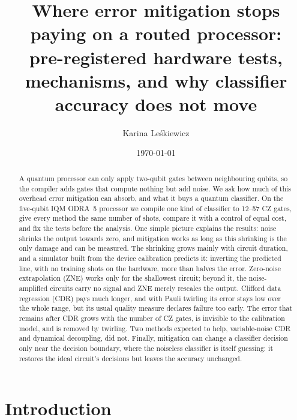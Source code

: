 \documentclass[aps,pra,twocolumn,superscriptaddress,nofootinbib,10pt]{revtex4-2}
\begin{document}
\title{Where error mitigation stops paying on a routed processor:\\
pre-registered hardware tests, mechanisms, and why classifier accuracy does not move}

\author{Karina Le\'skiewicz}

\date{\today}

\begin{abstract}
A quantum processor can only apply two-qubit gates between neighbouring qubits, so the
compiler adds gates that compute nothing but add noise. We ask how much of this overhead
error mitigation can absorb, and what it buys a quantum classifier. On the five-qubit IQM
ODRA~5 processor we compile one kind of classifier to 12--57 CZ gates, give every method the
same number of shots, compare it with a control of equal cost, and fix the tests before the
analysis. One simple picture explains the results: noise shrinks the output towards zero, and
mitigation works as long as this shrinking is the only damage and can be measured. The
shrinking grows mainly with circuit duration, and a simulator built from the device
calibration predicts it: inverting the predicted line, with no training shots on the
hardware, more than halves the error. Zero-noise extrapolation (ZNE) works only for the
shallowest circuit; beyond it, the noise-amplified circuits carry no signal and ZNE merely
rescales the output. Clifford data regression (CDR) pays much longer, and with Pauli twirling
its error stays low over the whole range, but its usual quality measure declares failure too
early. The error that remains after CDR grows with the number of CZ gates, is invisible to
the calibration model, and is removed by twirling. Two methods expected to help, variable-noise
CDR and dynamical decoupling, did not. Finally, mitigation can change a classifier decision
only near the decision boundary, where the noiseless classifier is itself guessing: it
restores the ideal circuit's decisions but leaves the accuracy unchanged.
\end{abstract}

\maketitle

\section{Introduction}
\end{document}
